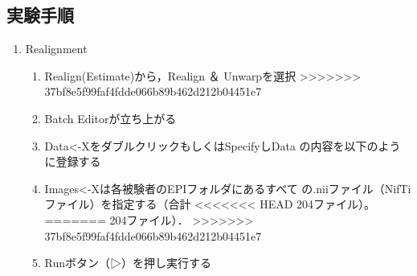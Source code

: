 \documentclass{jlreq}
\begin{document}
\begin{enumerate}
\begin{enumerate}
\begin{enumerate}
\subsection{実験手順}
\begin{enumerate}
    \item Realignment
    \begin{enumerate}
        \item Realign(Estimate)から，Realign ＆ Unwarpを選択
>>>>>>> 37bf8e5f99faf4fdde066b89b462d212b04451e7
        \item Batch Editorが立ち上がる
        \item Data<-XをダブルクリックもしくはSpecifyしData
の内容を以下のように登録する 
        \item Images<-Xは各被験者のEPIフォルダにあるすべて
の.niiファイル（NifTiファイル）を指定する（合計
<<<<<<< HEAD
204ファイル）。
=======
204ファイル）．
>>>>>>> 37bf8e5f99faf4fdde066b89b462d212b04451e7
        \item Runボタン（▷）を押し実行する 
    \end{enumerate}


\end{enumerate}
\end{enumerate}
\end{enumerate}
\end{enumerate}
\end{document}
